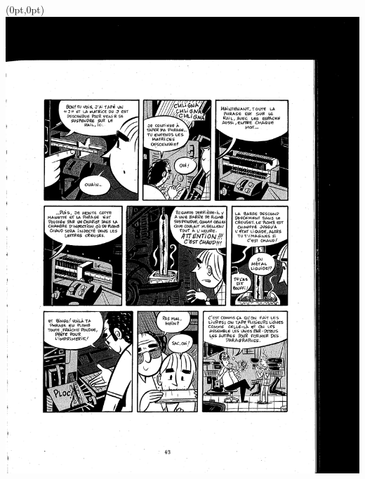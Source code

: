 \begin{textblock*}{440pt}(0pt,0pt)
  \includegraphics[angle=180]{paul-apprenti-typographe/paul-page_2}
\end{textblock*}
\null\clearpage

